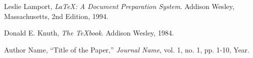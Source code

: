 \begin{thebibliography}{9}

  Leslie Lamport,
  \textit{\LaTeX: A Document Preparation System}.
  Addison Wesley, Massachusetts,
  2nd Edition,
  1994.

  Donald E. Knuth,
  \textit{The \TeX book}.
  Addison Wesley, 1984.

  Author Name,
  ``Title of the Paper,''
  \textit{Journal Name},
  vol. 1, no. 1, pp. 1-10, Year.

\end{thebibliography}
